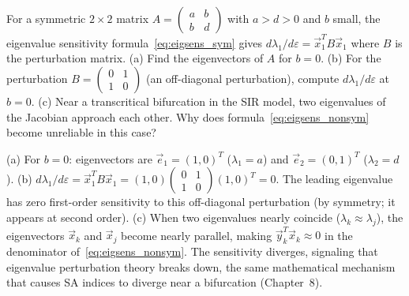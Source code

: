 \begin{selfcheck}
For a symmetric $2\times2$ matrix $A = \begin{pmatrix}a&b\\b&d\end{pmatrix}$
with $a>d>0$ and $b$ small, the eigenvalue sensitivity formula~\eqref{eq:eigsens_sym}
gives $d\lambda_1/d\varepsilon = \vec{x}_1^T B \vec{x}_1$
where $B$ is the perturbation matrix.
(a) Find the eigenvectors of $A$ for $b=0$.
(b) For the perturbation $B = \begin{pmatrix}0&1\\1&0\end{pmatrix}$
(an off-diagonal perturbation), compute $d\lambda_1/d\varepsilon$ at $b=0$.
(c) Near a transcritical bifurcation in the SIR model, two eigenvalues
of the Jacobian approach each other. Why does formula~\eqref{eq:eigsens_nonsym}
become unreliable in this case?
\end{selfcheck}
\begin{scAnswer}
(a) For $b=0$: eigenvectors are $\vec{e}_1 = (1,0)^T$ ($\lambda_1 = a$)
and $\vec{e}_2 = (0,1)^T$ ($\lambda_2 = d$).
(b) $d\lambda_1/d\varepsilon = \vec{x}_1^T B \vec{x}_1 = (1,0)\begin{pmatrix}0&1\\1&0\end{pmatrix}(1,0)^T = 0$.
The leading eigenvalue has zero first-order sensitivity to this off-diagonal perturbation
(by symmetry; it appears at second order).
(c) When two eigenvalues nearly coincide ($\lambda_k \approx \lambda_j$),
the eigenvectors $\vec{x}_k$ and $\vec{x}_j$ become nearly parallel,
making $\vec{y}_k^T\vec{x}_k \approx 0$ in the denominator of~\eqref{eq:eigsens_nonsym}.
The sensitivity diverges, signaling that eigenvalue perturbation theory breaks down,
the same mathematical mechanism that causes SA indices to diverge near a bifurcation
(Chapter~8).
\end{scAnswer}

